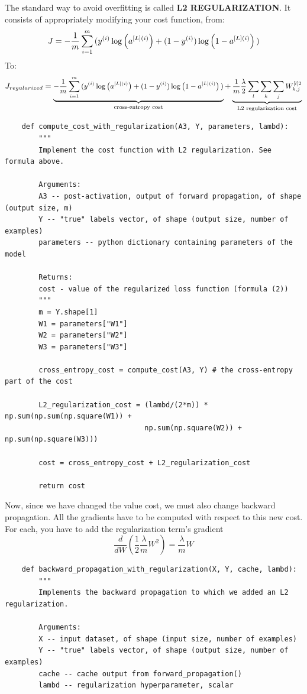 \documentclass[11pt, a4paper]{article}
\begin{document}
\begin{spacing}{1.1}
	\noindent The standard way to avoid overfitting is called \textbf{L2 REGULARIZATION}. It consists of appropriately modifying your cost function, from:	$$J = -\frac{1}{m} \sum\limits_{i = 1}^{m} \large{(}\small  y^{(i)}\log\left(a^{[L](i)}\right) + (1-y^{(i)})\log\left(1- a^{[L](i)}\right) \large{)}$$
	To:
	$$J_{regularized} = \small \underbrace{-\frac{1}{m} \sum\limits_{i = 1}^{m} \large{(}\small y^{(i)}\log\left(a^{[L](i)}\right) + (1-y^{(i)})\log\left(1- a^{[L](i)}\right) \large{)} }_\text{cross-entropy cost} + \underbrace{\frac{1}{m} \frac{\lambda}{2} \sum\limits_l\sum\limits_k\sum\limits_j W_{k,j}^{[l]2} }_\text{L2 regularization cost}$$
	\begin{lstlisting}
	def compute_cost_with_regularization(A3, Y, parameters, lambd):
		"""
		Implement the cost function with L2 regularization. See formula above.
		
		Arguments:
		A3 -- post-activation, output of forward propagation, of shape (output size, m)
		Y -- "true" labels vector, of shape (output size, number of examples)
		parameters -- python dictionary containing parameters of the model
		
		Returns:
		cost - value of the regularized loss function (formula (2))
		"""
		m = Y.shape[1]
		W1 = parameters["W1"]
		W2 = parameters["W2"]
		W3 = parameters["W3"]
		
		cross_entropy_cost = compute_cost(A3, Y) # the cross-entropy part of the cost
		
		L2_regularization_cost = (lambd/(2*m)) * np.sum(np.sum(np.square(W1)) + 
		                         np.sum(np.square(W2)) + np.sum(np.square(W3)))
		
		cost = cross_entropy_cost + L2_regularization_cost
		
		return cost\end{lstlisting} \vspace*{1mm}
	Now, since we have changed the value cost, we must also change backward propagation. All the gradients have to be computed with respect to this new cost. For each, you have to add the regularization term's gradient $$\frac{d}{dW} ( \frac{1}{2}\frac{\lambda}{m}  W^2) = \frac{\lambda}{m} W$$
	\begin{lstlisting}
	def backward_propagation_with_regularization(X, Y, cache, lambd):
		"""
		Implements the backward propagation to which we added an L2 regularization.
		
		Arguments:
		X -- input dataset, of shape (input size, number of examples)
		Y -- "true" labels vector, of shape (output size, number of examples)
		cache -- cache output from forward_propagation()
		lambd -- regularization hyperparameter, scalar
		

\end{lstlisting}
\end{spacing}
\end{document}

